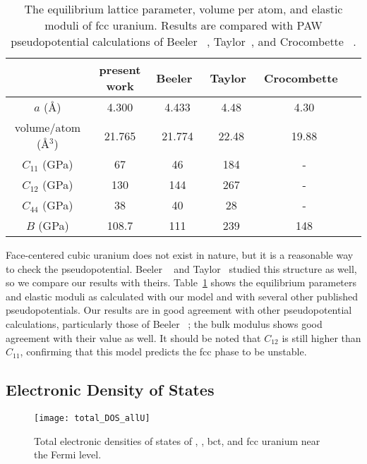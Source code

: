 \begin{table}
\caption[Comparison of ground-state properties and elastic parameters of fcc uranium]{The equilibrium lattice parameter, volume per atom, and elastic moduli
of fcc uranium. Results are compared with PAW pseudopotential calculations of
Beeler \etal~\cite{beeler2013first}, Taylor~\cite{taylor2008evaluation}, and
Crocombette \etal~\cite{crocombette2001plane}.}
\label{table:eq_fcc}
\begin{tabular}{cccccc}
  \hline
				   & present work & Beeler~\cite{beeler2013first} & Taylor~\cite{taylor2008evaluation} & Crocombette~\cite{crocombette2001plane} \\ \hline
$a$ (\AA)				   & 4.300  		  & 4.433	& 4.48	 & 4.30				\\
volume/atom (\AA$^3$)	   & 21.765   & 21.774	& 22.48  & 19.88			\\ 
$C_{11}$ (GPa) &  	67			& 46	 & 184 &-	  \\
$C_{12}$ (GPa) &	130			& 144	 & 267 &-	  \\
$C_{44}$ (GPa) &	38			& 40	 & 28  &-   \\
$B$ (GPa)		&	108.7		& 111	 & 239	&148	\\
  \hline
\end{tabular}
\end{table}
Face-centered cubic uranium does not exist in nature, but it is a reasonable
way to check the pseudopotential. Beeler \etal~\cite{beeler2013first} and
Taylor~\cite{taylor2008evaluation} studied this structure as well, so we
compare our results with theirs.
Table~\ref{table:eq_fcc} shows the equilibrium parameters and elastic moduli
as calculated with our model and with several other published pseudopotentials.
Our results are in good agreement with other pseudopotential calculations,
particularly those of Beeler \etal~\cite{beeler2013first};
the bulk modulus shows good agreement with their value as well.
It should be noted that $C_{12}$ is still higher than $C_{11}$, confirming that this model predicts the fcc phase to be unstable.

\subsection{Electronic Density of States}
\begin{figure}
	\centering
	\texttt{[image: total\_DOS\_allU]}
    \caption{Total electronic densities of states of \textalpha, \textgamma,
      bct, and fcc uranium near the Fermi level.}
	\label{fig:totDos}
\end{figure}

